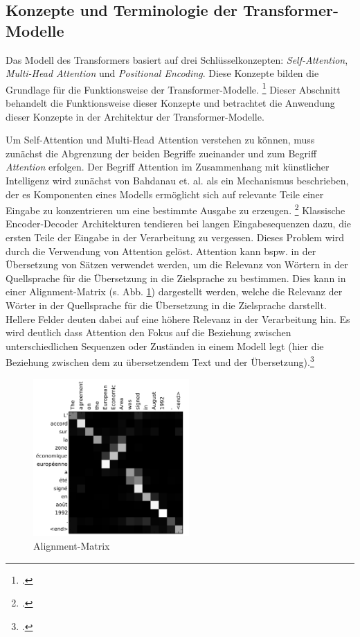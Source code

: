 \subsection{Konzepte und Terminologie der Transformer-Modelle}
Das Modell des Transformers basiert auf drei Schlüsselkonzepten: \emph{Self-Attention}, \emph{Multi-Head Attention} und \emph{Positional Encoding}. Diese Konzepte bilden die Grundlage für die Funktionsweise der Transformer-Modelle. \footcites[Vgl.][S. 1]{vaswani_attention_2017} Dieser Abschnitt behandelt die Funktionsweise dieser Konzepte und betrachtet die Anwendung dieser Konzepte in der Architektur der Transformer-Modelle.

Um Self-Attention und Multi-Head Attention verstehen zu können, muss zunächst die Abgrenzung der beiden Begriffe zueinander und zum Begriff \emph{Attention} erfolgen. Der Begriff Attention im Zusammenhang mit künstlicher Intelligenz wird zunächst von Bahdanau et. al. als ein Mechanismus beschrieben, der es Komponenten eines Modells ermöglicht sich auf relevante Teile einer Eingabe zu konzentrieren um eine bestimmte Ausgabe zu erzeugen. \footcites[Vgl.][S. 2 ff.]{bahdanau_neural_2014} Klassische Encoder-Decoder Architekturen tendieren bei langen Eingabesequenzen dazu, die ersten Teile der Eingabe in der Verarbeitung zu vergessen. Dieses Problem wird durch die Verwendung von Attention gelöst. Attention kann bspw. in der Übersetzung von Sätzen verwendet werden, um die Relevanz von Wörtern in der Quellsprache für die Übersetzung in die Zielsprache zu bestimmen. Dies kann in einer Alignment-Matrix (s. Abb. \ref{fig:attention}) dargestellt werden, welche die Relevanz der Wörter in der Quellsprache für die Übersetzung in die Zielsprache darstellt. Hellere Felder deuten dabei auf eine höhere Relevanz in der Verarbeitung hin. Es wird deutlich dass Attention den Fokus auf die Beziehung zwischen unterschiedlichen Sequenzen oder Zuständen in einem Modell legt (hier die Beziehung zwischen dem zu übersetzendem Text und der Übersetzung).\footcites[Vgl.][S. 5 ff.]{bahdanau_neural_2014}
\begin{figure}[h]
    \centering
    \includegraphics[height=60mm]{graphics/alignment_matrix.png}
    \caption[Alignment-Matrix]{Alignment-Matrix \footnotemark}
    \label{fig:attention}
\end{figure}

